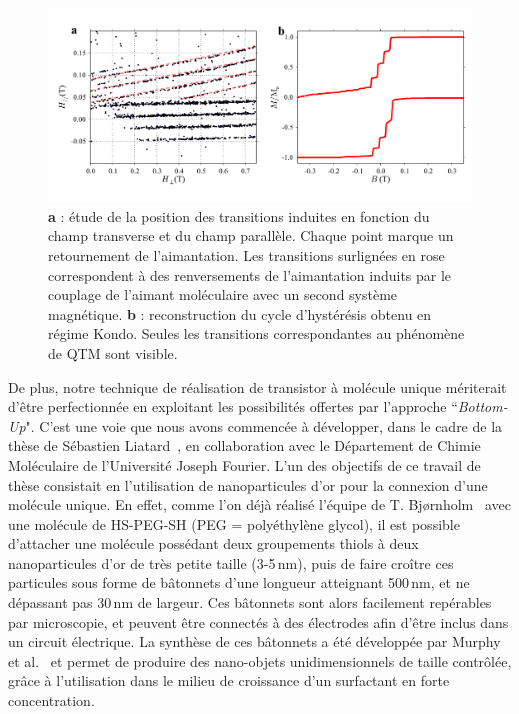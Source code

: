 \begin{figure}[h!]
\includegraphics[scale=0.45]{Conclusion/TranInd/TransInd.pdf} 
\caption{\textbf{a} : étude de la position des transitions induites en fonction du champ transverse et du champ parallèle. Chaque point marque un retournement de l'aimantation. Les transitions surlignées en rose correspondent à des renversements de l'aimantation induits par le couplage de l'aimant moléculaire avec un second système magnétique. \textbf{b} : reconstruction du cycle d'hystérésis obtenu en régime Kondo. Seules les transitions correspondantes au phénomène de QTM sont visible.}
\label{TransIndConcl}
\end{figure}


De plus, notre technique de réalisation de transistor à molécule unique mériterait d’être perfectionnée en exploitant les possibilités offertes par l’approche ``\textit{Bottom-Up}". C'est une voie que nous avons commencée à développer, dans le cadre de la thèse de Sébastien Liatard~\cite{Liatard2012}, en collaboration avec le Département de Chimie Moléculaire de l’Université Joseph Fourier. L’un des objectifs de ce travail de thèse consistait en l’utilisation de nanoparticules d'or pour la connexion d’une molécule unique. En effet, comme l'on déjà réalisé l'équipe de T. Bjørnholm~\cite{Jain2009} avec une molécule de HS-PEG-SH (PEG = polyéthylène glycol), il est possible d'attacher une molécule possédant deux groupements thiols à deux nanoparticules d'or de très petite taille (3-5\,nm), puis de faire croître ces particules sous forme de bâtonnets d'une longueur atteignant 500\,nm, et ne dépassant pas 30\,nm de largeur. Ces bâtonnets sont alors facilement repérables par microscopie, et peuvent être connectés à des électrodes afin d'être inclus dans un circuit électrique. La synthèse de ces bâtonnets a été développée par Murphy et al.~\cite{Murphy2006} et permet de produire des nano-objets unidimensionnels de taille contrôlée, grâce à l'utilisation dans le milieu de croissance d'un surfactant en forte concentration. 

